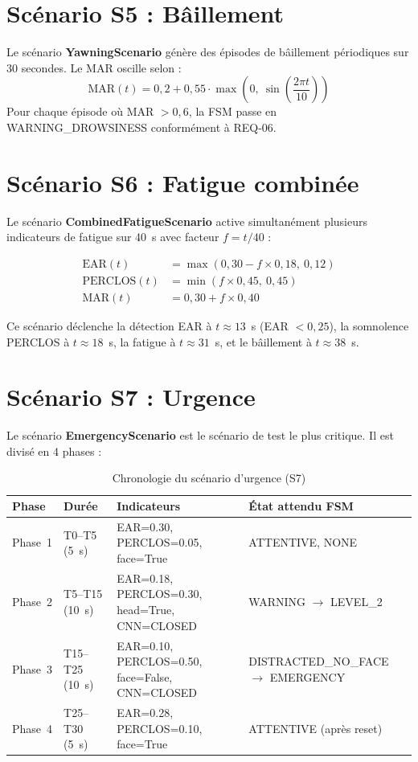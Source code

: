 \documentclass[12pt,a4paper]{report}
\begin{document}
\section{Sc\'enario S5 : B\^aillement}

Le sc\'enario \textbf{YawningScenario} g\'en\`ere des \'episodes de b\^aillement p\'eriodiques sur 30 secondes. Le MAR oscille selon :
\begin{equation}
  \text{MAR}(t) = 0{,}2 + 0{,}55 \cdot \max\!\left(0,\ \sin\!\left(\frac{2\pi t}{10}\right)\right)
\end{equation}
Pour chaque \'episode o\`u MAR $> 0{,}6$, la FSM passe en WARNING\_DROWSINESS conform\'ement \`a REQ-06.

\section{Sc\'enario S6 : Fatigue combin\'ee}

Le sc\'enario \textbf{CombinedFatigueScenario} active simultan\'ement plusieurs indicateurs de fatigue sur 40~s avec facteur $f = t/40$ :

\begin{align}
  \text{EAR}(t) &= \max(0{,}30 - f \times 0{,}18,\ 0{,}12) \\
  \text{PERCLOS}(t) &= \min(f \times 0{,}45,\ 0{,}45) \\
  \text{MAR}(t) &= 0{,}30 + f \times 0{,}40
\end{align}

Ce sc\'enario d\'eclenche la d\'etection EAR \`a $t \approx 13$~s (EAR $< 0{,}25$), la somnolence PERCLOS \`a $t \approx 18$~s, la fatigue \`a $t \approx 31$~s, et le b\^aillement \`a $t \approx 38$~s.

\section{Sc\'enario S7 : Urgence}

Le sc\'enario \textbf{EmergencyScenario} est le sc\'enario de test le plus critique. Il est divis\'e en 4 phases :

\begin{table}[H]
\centering
\caption{Chronologie du sc\'enario d'urgence (S7)}
\label{tab:emergency_timeline}
\begin{tabular}{C{1.5cm} C{1.8cm} L{4.5cm} L{4.5cm}}
\toprule
\textbf{Phase} & \textbf{Dur\'ee} & \textbf{Indicateurs} & \textbf{\'Etat attendu FSM} \\
\midrule
Phase~1 & T0--T5 (5~s) & EAR=0.30, PERCLOS=0.05, face=True & ATTENTIVE, NONE \\
Phase~2 & T5--T15 (10~s) & EAR=0.18, PERCLOS=0.30, head=True, CNN=CLOSED & WARNING $\to$ LEVEL\_2 \\
Phase~3 & T15--T25 (10~s) & EAR=0.10, PERCLOS=0.50, face=False, CNN=CLOSED & DISTRACTED\_NO\_FACE $\to$ EMERGENCY \\
Phase~4 & T25--T30 (5~s) & EAR=0.28, PERCLOS=0.10, face=True & ATTENTIVE (apr\`es reset) \\
\bottomrule
\end{tabular}
\end{table}
\end{document}
